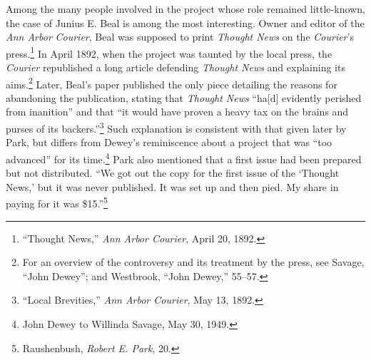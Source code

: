 \documentclass[twoside,symmetric,nobib,justified]{tufte-book}
\begin{document}
\newpage Among the many people involved in the project whose role remained
little-known, the case of Junius E. Beal is among the most interesting.
Owner and editor of the \emph{Ann Arbor} \emph{Courier}, Beal was
supposed to print \emph{Thought News} on the \emph{Courier}'s
press.\footnote{``Thought News,'' \emph{Ann Arbor Courier}, April 20,
  1892.} In April 1892, when the project was taunted by the local press,
the \emph{Courier} republished a long article defending \emph{Thought
News} and explaining its aims.\footnote{For an overview of the
  controversy and its treatment by the press, see Savage, ``John
  Dewey''; and Westbrook, ``John Dewey,'' 55--57.} Later, Beal's paper
published the only piece detailing the reasons for abandoning the
publication, stating that \emph{Thought News} ``ha{[}d{]} evidently
perished from inanition'' and that ``it would have proven a heavy tax on
the brains and purses of its backers.''\footnote{``Local Brevities,''
  \emph{Ann Arbor Courier}, May 13, 1892.} Such explanation is
consistent with that given later by Park, but differs from Dewey's
reminiscence about a project that was ``too advanced'' for its
time.\footnote{John Dewey to Willinda Savage, May 30, 1949.} Park also
mentioned that a first issue had been prepared but not distributed. ``We
got out the copy for the first issue of the `Thought News,' but it was
never published. It was set up and then pied. My share in paying for it
was \$15.''\footnote{Raushenbush, \emph{Robert E. Park}, 20.}
\end{document}
